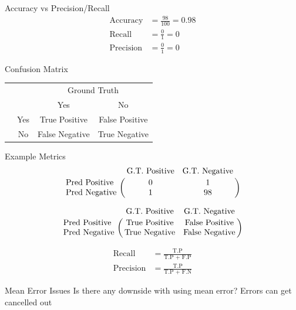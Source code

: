 \documentclass[usenames,dvipsnames]{beamer}
\begin{document}
\begin{frame}{Accuracy vs Precision/Recall}
\begin{align*}
\text{Accuracy} &= \frac{98}{100} = 0.98 \\
\text{Recall} &= \frac{0}{1} = 0 \\
\text{Precision} &= \frac{0}{1} = 0
\end{align*}

\end{frame}

\begin{frame}{Confusion Matrix}
\vspace{60pt}
\begin{center}
\begin{tabular}{@{}cc cc@{}}
	\multicolumn{1}{c}{} &\multicolumn{1}{c}{} &\multicolumn{2}{c}{Ground Truth} \\ 
	\cmidrule(lr){3-4}
	\multicolumn{1}{c}{} & 
	\multicolumn{1}{c}{} & 
	\multicolumn{1}{c}{Yes} & 
	\multicolumn{1}{c}{No} \\ 
	\cline{2-4}
	\multirow[c]{2}{*}{\rotatebox[origin=tr]{90}{Predicted}}
	& Yes  & True Positive & False Positive   \\[1.5ex]
	& No  & False Negative   & True Negative \\ 
	\cline{2-4}
\end{tabular}
\end{center}
\end{frame}

\begin{frame}{Example Metrics}
\[
\bordermatrix{&\text{G.T. Positive}&\text{G.T. Negative}\cr
               \text{Pred Positive}&0&1\cr
               \text{Pred Negative}&1&98}
\]

\pause
\[
\bordermatrix{&\text{G.T. Positive}&\text{G.T. Negative}\cr
               \text{Pred Positive}&\text{True Positive}&\text{False Positive}\cr
               \text{Pred Negative}&\text{True Negative}&\text{False Negative}}
\]

\pause
\begin{align*}
\text{Recall} &= \frac{\text{T.P}}{\text{T.P + F.P}} \\
\text{Precision} &= \frac{\text{T.P}}{\text{T.P + F.N}}
\end{align*}
\end{frame}


\begin{frame}{Mean Error Issues}
Is there any downside with using mean error?
\pause Errors can get cancelled out

\end{frame}
\end{document}
